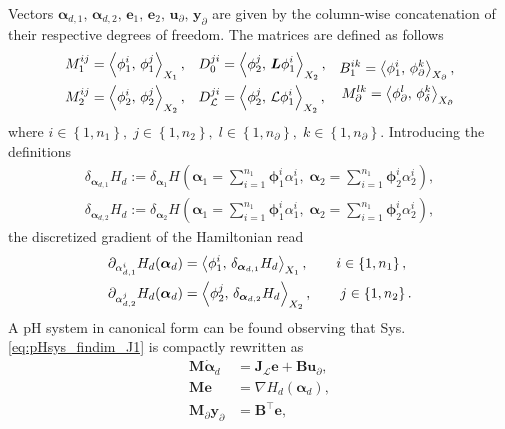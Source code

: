 Vectors $\bm{\alpha}_{d, 1},\, \bm{\alpha}_{d, 2}, \, \mathbf{e}_{1}, \, \mathbf{e}_{2}, \, \mathbf{u}_\partial, \, \mathbf{y}_\partial$ are given by the column-wise concatenation of their respective degrees of freedom. The matrices are defined as follows 
\begin{equation}
\begin{aligned}
M_1^{ij} &= \inner[X_1]{\phi_1^i}{\phi_1^j}, \\
M_2^{ij} &= \inner[X_2]{\phi_2^i}{\phi_2^j}, \\
\end{aligned}\quad
\begin{aligned}
{D}_{0}^{ji} &= \inner[X_2]{\phi_2^j}{\bm{L}\phi_1^i}, \\
{D}_{\mathcal{L}}^{ji} &= \inner[X_2]{\phi_2^j}{\mathcal{L}\phi_1^i}, 
\end{aligned}\quad  
\begin{aligned}
{B}_{1}^{ik} = \inner[X_\partial]{\phi_1^i}{\phi_\partial^k}, \\
M_\partial^{lk} = \inner[X_\partial]{\phi_\partial^l}{\phi_\delta^k}
\end{aligned}
\end{equation}
where $i \in \left\{1, n_1\right\}, \; j \in \left\{1, n_2\right\}, \; l \in \left\{1, n_\partial \right\}, \; k \in \left\{1, n_\partial \right\}$. Introducing the definitions
\begin{align*}
	\delta_{\bm{\alpha}_{d, 1}} H_d := \delta_{\bm{\alpha}_{1}} H\left(\bm{\alpha}_1 = \sum_{i=1}^{n_1} \bm{\phi}_1^i \alpha_1^i, \;  \bm{\alpha}_2 = \sum_{i=1}^{n_1} \bm{\phi}_2^i \alpha_2^i\right), \\
	\delta_{\bm{\alpha}_{d, 2}} H_d := \delta_{\bm{\alpha}_{2}} H\left(\bm{\alpha}_1 = \sum_{i=1}^{n_1} \bm{\phi}_1^i \alpha_1^i, \;  \bm{\alpha}_2 = \sum_{i=1}^{n_1} \bm{\phi}_2^i \alpha_2^i\right),
\end{align*}
the discretized gradient of the Hamiltonian read
\begin{equation}
\begin{aligned}
\partial_{{\alpha}_{d, 1}^i} H_d(\bm{\alpha}_d) &= \inner[X_1]{\phi_1^i}{\delta_{\bm{\alpha}_{d, 1}} H_d}, \qquad i \in \left\{1, n_1\right\}, \\
\partial_{{\alpha}_{d, 2}^j} H_d(\bm{\alpha}_d) &= \inner[X_2]{\phi_2^j}{\delta_{\bm{\alpha}_{d, 2}} H_d}, \qquad j \in \left\{1, n_2\right\}.
\end{aligned}
\end{equation}
A pH system in canonical form can be found observing that Sys. \eqref{eq:pHsys_findim_J1} is compactly rewritten as 
\begin{align}
\mathbf{M} \dot{\bm{\alpha}}_{d} &= \mathbf{J}_{\mathcal{L}} \mathbf{e} + \mathbf{B}\mathbf{u}_\partial, \label{eq:pHfindim_dyn1} \\
\mathbf{M} \mathbf{e} &= \nabla H_d(\bm{\alpha}_d), \label{eq:pHfindin_e}\\
\mathbf{M}_\partial {\mathbf{y}_\partial} &= \mathbf{B}^\top \mathbf{e},
\end{align}

